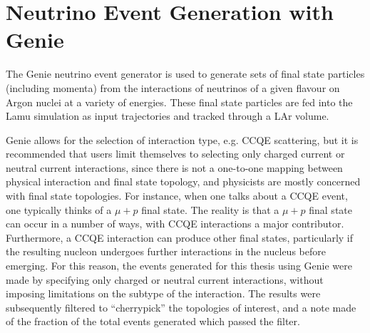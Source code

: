 \section{Neutrino Event Generation with Genie}
The Genie\citep{Genie} neutrino event generator is used to generate sets of final state particles (including momenta) from the interactions of neutrinos of a given flavour on Argon nuclei at a variety of energies. These final state particles are fed into the Lamu simulation as input trajectories and tracked through a \ac{LAr} volume.

Genie allows for the selection of interaction type, e.g. \ac{CCQE} scattering, but it is recommended that users limit themselves to selecting only charged current or neutral current interactions, since there is not a one-to-one mapping between physical interaction and final state topology, and physicists are mostly concerned with final state topologies. For instance, when one talks about a \ac{CCQE} event, one typically thinks of a $\mu+p$ final state. The reality is that a $\mu+p$ final state can occur in a number of ways, with \ac{CCQE} interactions a major contributor. Furthermore, a \ac{CCQE} interaction can produce other final states, particularly if the resulting nucleon undergoes further interactions in the nucleus before emerging. For this reason, the events generated for this thesis using Genie were made by specifying only charged or neutral current interactions, without imposing limitations on the subtype of the interaction. The results were subsequently filtered to ``cherrypick'' the topologies of interest, and a note made of the fraction of the total events generated which passed the filter.


